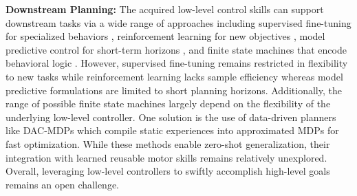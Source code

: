 \textbf{Downstream Planning:} 
The acquired low-level control skills can support downstream tasks via a wide range of approaches including supervised fine-tuning for specialized behaviors \cite{Yao2023MoConVQUP},  reinforcement learning for new objectives \cite{merel_catch_2020, Luo2023UniversalHM, Peng2022ASE, Dou2023CASELC},  model predictive control for short-term horizons \cite{jiang2023hgap}, and finite state machines that encode behavioral logic \cite{Tessler2023CALMCA}. However, supervised fine-tuning remains restricted in flexibility to new tasks while reinforcement learning lacks sample efficiency whereas model predictive formulations are limited to short planning horizons. Additionally, the range of possible finite state machines largely depend on the flexibility of the underlying low-level controller. One solution is the use of data-driven planners like DAC-MDPs \cite{Shrestha2020DeepAveragersOR} which compile static experiences into approximated MDPs for fast optimization. While these methods enable zero-shot generalization, their integration with learned reusable motor skills remains relatively unexplored. Overall, leveraging low-level controllers to swiftly accomplish high-level goals remains an open challenge.